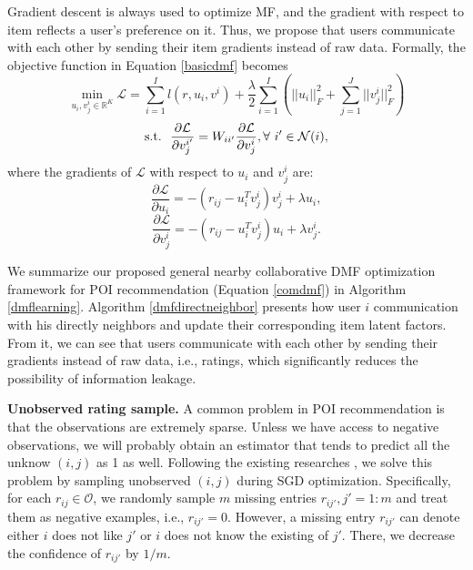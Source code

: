 Gradient descent is always used to optimize MF, and the gradient with respect to item reflects a user's preference on it. 
Thus, we propose that users communicate with each other by sending their item gradients instead of raw data. 
Formally, the objective function in Equation \ref{basicdmf} becomes 
\begin{equation}\nonumber\label{comdmf}
\mathop { \min }\limits_{u_i,v^i_j \in \mathbb{R}^K} \mathcal{L} = \sum\limits_{i=1}^{I} l(r,u_i,v^i) + \frac{\lambda}{2} \sum\limits_{i=1}^I \left( ||{u_i}||_F^2 + \sum\limits_{j=1}^J||v^i_j||_F^2 \right)
\end{equation} 
\begin{equation}
{\rm s.t.} ~~ \frac{\partial \mathcal{L}}{\partial v^{i'}_j}=W_{ii'}\frac{\partial \mathcal{L}}{\partial v^i_j}, \forall ~ i' \in {\mathcal{N}(i)},
\end{equation} 
where the gradients of $\mathcal{L}$ with respect to $u_i$ and $v^i_j$ are:
\begin{equation}
\label{usergradient}
\frac{\partial \mathcal{L}}{\partial u_i} = -{\left(r_{ij} - u_i^T v^i_j\right)}v^i_j + \lambda u_{i},
\end{equation} 
\begin{equation}
\label{itemgradient}
\frac{\partial \mathcal{L}}{\partial v^i_j} = -{\left(r_{ij} - u_i^T v^i_j\right)}u_i + \lambda v^i_j.
\end{equation} 


We summarize our proposed general nearby collaborative DMF optimization framework for POI recommendation (Equation \ref{comdmf}) in Algorithm \ref{dmflearning}. 
Algorithm \ref{dmfdirectneighbor} presents how user $i$ communication with his directly neighbors and update their corresponding item latent factors. 
From it, we can see that users communicate with each other by sending their gradients instead of raw data, i.e., ratings, which significantly reduces the possibility of information leakage. 



\textbf{Unobserved rating sample.} 
A common problem in POI recommendation is that the observations are extremely sparse. 
Unless we have access to negative observations, we will probably obtain an estimator that tends to predict all the unknow $(i,j)$ as 1 as well. 
Following the existing researches \cite{yang2011like}, we solve this problem by sampling unobserved $(i,j)$ during SGD optimization. 
Specifically, for each $r_{ij} \in \mathcal{O}$, we randomly sample $m$ missing entries $r_{ij'}, j'=1:m$ and treat them as negative examples, i.e., $r_{ij'}=0$. 
However, a missing entry $r_{ij'}$ can denote either $i$ does not like $j'$ or $i$ does not know the existing of $j'$. 
There, we decrease the confidence of $r_{ij'}$ by $1/m$. 


